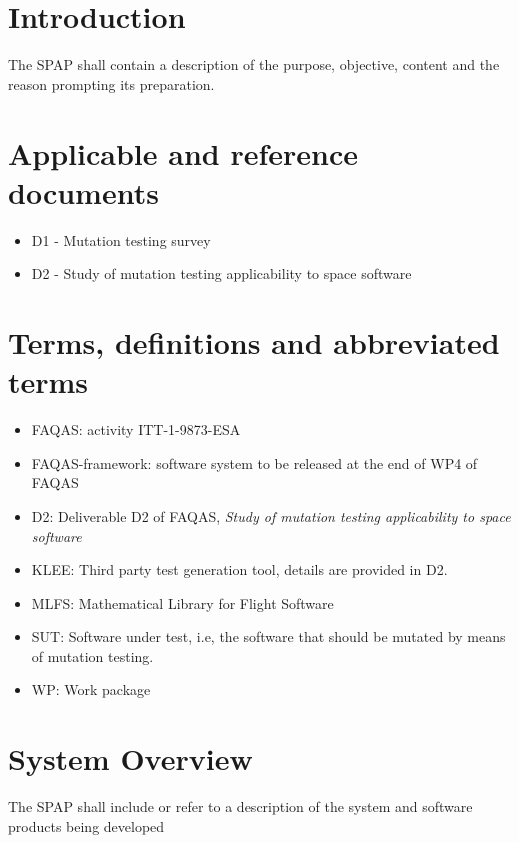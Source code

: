 
\chapter{Introduction}

The SPAP shall contain a description of the purpose, objective, content and the reason prompting its preparation.

\chapter{Applicable and reference documents}


\begin{itemize}
\item{D1 - Mutation testing survey}
\item{D2 - Study of mutation testing applicability to space software}
\end{itemize}

\chapter{Terms, definitions and abbreviated terms}

\begin{itemize}
\item{FAQAS}: activity ITT-1-9873-ESA
\item{FAQAS-framework}: software system to be released at the end of WP4 of FAQAS
\item{D2}: Deliverable D2 of FAQAS, \emph{Study of mutation testing applicability to space software}
\item{KLEE}: Third party test generation tool, details are provided in D2.
\item{MLFS}: Mathematical Library for Flight Software
\item{SUT}: Software under test, i.e, the software that should be mutated by means of mutation testing.
\item{WP}: Work package

\end{itemize}

\chapter{System Overview}

The SPAP shall include or refer to a description of the system and software products being developed

\clearpage
